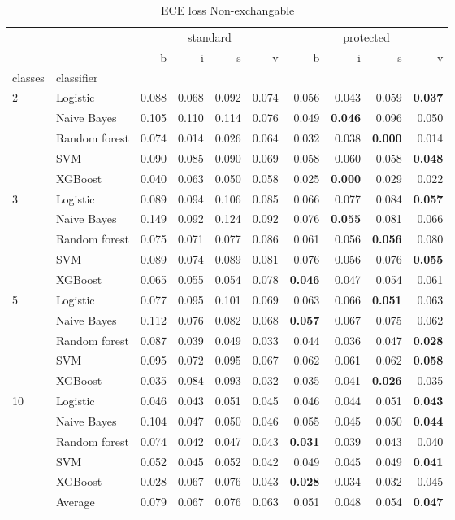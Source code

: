 \begin{table}
\caption{ECE loss Non-exchangable}
\begin{tabular}{l|l|rrrr|rrrr}
\toprule
 &  & \multicolumn{4}{c}{standard} & \multicolumn{4}{c}{protected} \\
 &  & b & i & s & v & b & i & s & v \\
classes & classifier &  &  &  &  &  &  &  &  \\
\midrule
\midrule
\multirow[c]{5}{*}{2} & Logistic & 0.088 & 0.068 & 0.092 & 0.074 & 0.056 & 0.043 & 0.059 & \textbf{0.037} \\
 & Naive Bayes & 0.105 & 0.110 & 0.114 & 0.076 & 0.049 & \textbf{0.046} & 0.096 & 0.050 \\
 & Random forest & 0.074 & 0.014 & 0.026 & 0.064 & 0.032 & 0.038 & \textbf{0.000} & 0.014 \\
 & SVM & 0.090 & 0.085 & 0.090 & 0.069 & 0.058 & 0.060 & 0.058 & \textbf{0.048} \\
 & XGBoost & 0.040 & 0.063 & 0.050 & 0.058 & 0.025 & \textbf{0.000} & 0.029 & 0.022 \\
\midrule
\multirow[c]{5}{*}{3} & Logistic & 0.089 & 0.094 & 0.106 & 0.085 & 0.066 & 0.077 & 0.084 & \textbf{0.057} \\
 & Naive Bayes & 0.149 & 0.092 & 0.124 & 0.092 & 0.076 & \textbf{0.055} & 0.081 & 0.066 \\
 & Random forest & 0.075 & 0.071 & 0.077 & 0.086 & 0.061 & 0.056 & \textbf{0.056} & 0.080 \\
 & SVM & 0.089 & 0.074 & 0.089 & 0.081 & 0.076 & 0.056 & 0.076 & \textbf{0.055} \\
 & XGBoost & 0.065 & 0.055 & 0.054 & 0.078 & \textbf{0.046} & 0.047 & 0.054 & 0.061 \\
\midrule
\multirow[c]{5}{*}{5} & Logistic & 0.077 & 0.095 & 0.101 & 0.069 & 0.063 & 0.066 & \textbf{0.051} & 0.063 \\
 & Naive Bayes & 0.112 & 0.076 & 0.082 & 0.068 & \textbf{0.057} & 0.067 & 0.075 & 0.062 \\
 & Random forest & 0.087 & 0.039 & 0.049 & 0.033 & 0.044 & 0.036 & 0.047 & \textbf{0.028} \\
 & SVM & 0.095 & 0.072 & 0.095 & 0.067 & 0.062 & 0.061 & 0.062 & \textbf{0.058} \\
 & XGBoost & 0.035 & 0.084 & 0.093 & 0.032 & 0.035 & 0.041 & \textbf{0.026} & 0.035 \\
\midrule
\multirow[c]{5}{*}{10} & Logistic & 0.046 & 0.043 & 0.051 & 0.045 & 0.046 & 0.044 & 0.051 & \textbf{0.043} \\
 & Naive Bayes & 0.104 & 0.047 & 0.050 & 0.046 & 0.055 & 0.045 & 0.050 & \textbf{0.044} \\
 & Random forest & 0.074 & 0.042 & 0.047 & 0.043 & \textbf{0.031} & 0.039 & 0.043 & 0.040 \\
 & SVM & 0.052 & 0.045 & 0.052 & 0.042 & 0.049 & 0.045 & 0.049 & \textbf{0.041} \\
 & XGBoost & 0.028 & 0.067 & 0.076 & 0.043 & \textbf{0.028} & 0.034 & 0.032 & 0.045 \\\midrule\ & Average & 0.079 & 0.067 & 0.076 & 0.063 & 0.051 & 0.048 & 0.054 & \textbf{0.047} \\
\bottomrule
\end{tabular}
\end{table}
